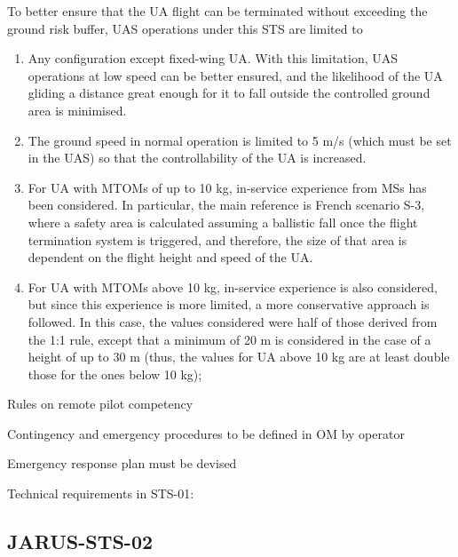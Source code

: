 \documentclass{ua_wgs_base}
\begin{document}
To better ensure that the UA flight can be terminated without exceeding
the ground risk buffer, UAS operations under this STS are limited
to
\begin{enumerate}
\item Any configuration except fixed-wing UA. With this limitation, UAS
operations at low speed can be better ensured, and the likelihood
of the UA gliding a distance great enough for it to fall outside the
controlled ground area is minimised.
\item The ground speed in normal operation is limited to 5 m/s (which must
be set in the UAS) so that the controllability of the UA is increased.
\item For UA with MTOMs of up to 10 kg, in-service experience from MSs has
been considered. In particular, the main reference is French scenario
S-3, where a safety area is calculated assuming a ballistic fall once
the flight termination system is triggered, and therefore, the size
of that area is dependent on the flight height and speed of the UA. 
\item For UA with MTOMs above 10 kg, in-service experience is also considered,
but since this experience is more limited, a more conservative approach
is followed. In this case, the values considered were half of those
derived from the 1:1 rule, except that a minimum of 20 m is considered
in the case of a height of up to 30 m (thus, the values for UA above
10 kg are at least double those for the ones below 10 kg);
\end{enumerate}
Rules on remote pilot competency 

Contingency and emergency procedures to be defined in OM by operator

Emergency response plan must be devised 

Technical requirements in STS-01:

\subsection{JARUS-STS-02}
\end{document}
